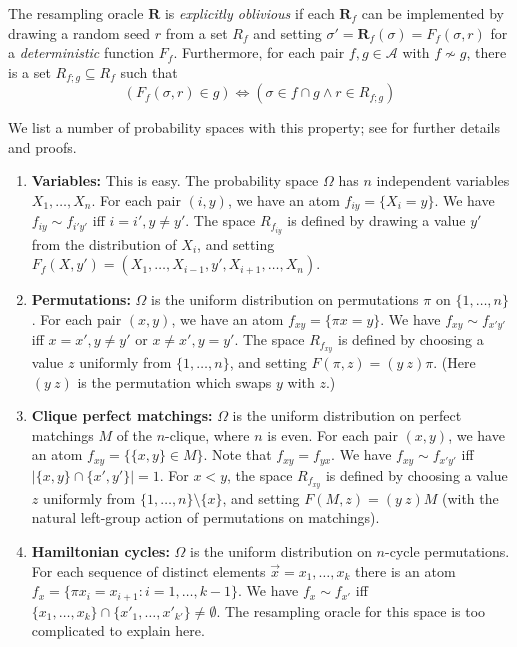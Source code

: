 \documentclass{toc}
\begin{document}
\begin{definition}
  \label{obliv-def}

  The resampling oracle $\mathbf R$ is \emph{explicitly oblivious} 
if each $\mathbf R_f$ can be implemented by drawing a random seed $r$ from a set $R_f$ and setting $\sigma' = \mathbf R_f(\sigma) =  F_f( \sigma, r)$ for a \emph{deterministic} function $F_f$. Furthermore, for each pair $f, g \in \mathcal A$ with $f \not \sim g$, there is a set $R_{f;g} \subseteq R_f$ such that $$
(F_f(\sigma, r) \in g ) \Leftrightarrow (\sigma \in f \cap g \wedge  r \in R_{f;g})
  $$
\end{definition}

We list a number of probability spaces with this property; see \cite{ParallelHarris} for further details and proofs.
\begin{enumerate}
\item \textbf{Variables:} This is easy. The probability space $\Omega$ has $n$ independent variables $X_1, \dots, X_n$. For each pair $(i,y)$, we have an atom $f_{iy} = \{ X_{i}  = y \}$. We have $f_{iy} \sim f_{i'y'}$ iff $i = i', y \neq y'$. The space $R_{f_{iy}}$ is defined by drawing a value $y'$ from the distribution of $X_i$, and setting $F_f(X, y') = (X_1, \dots, X_{i-1}, y', X_{i+1}, \dots, X_n)$.

\item \textbf{Permutations:} $\Omega$ is the uniform distribution on permutations $\pi$ on $\{1, \dots, n \}$.  For each pair $(x,y)$, we have an atom $f_{xy} = \{ \pi x  = y \}$. We have $f_{xy} \sim f_{x'y'}$ iff $x = x', y \neq y'$ or $x \neq x', y = y'$. The space $R_{f_{xy}}$ is defined by choosing a value $z$ uniformly from $ \{1, \dots, n \}$, and setting $F(\pi, z) = (y \ z) \pi$. (Here $(y \ z)$ is the permutation which swaps $y$ with $z$.)


\item \textbf{Clique perfect matchings:}  $\Omega$ is the uniform distribution on perfect matchings $M$ of the $n$-clique, where $n$ is even. For each pair $(x,y)$, we have an atom $f_{xy} = \{ \{x, y \} \in M \}$. Note that $f_{xy} = f_{yx}$.  We have $f_{xy} \sim f_{x'y'}$ iff $| \{ x, y \} \cap \{x', y' \} |= 1 $. For $x < y$, the space $R_{f_{xy}}$ is defined by choosing a value $z$ uniformly from $\{1, \dots, n \} \setminus \{x \}$, and setting $F(M, z) = (y \ z) M$ (with the natural left-group action of permutations on matchings).

\item \textbf{Hamiltonian cycles:} $\Omega$ is the uniform distribution on $n$-cycle permutations.  For each sequence of distinct elements $\vec x = x_1, \dots, x_k$ there is an atom $f_{x} = \{ \pi x_i = x_{i+1}: i = 1, \dots, k-1 \}$. We have $f_{x} \sim f_{x'}$ iff $\{x_1, \dots, x_k \} \cap \{x'_1, \dots, x'_{k'} \} \neq \emptyset$. The resampling oracle for this space is too complicated to explain here.
\end{enumerate}
\end{document}
